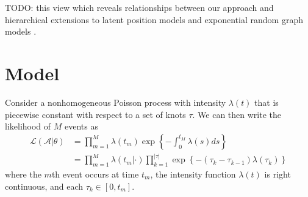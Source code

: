 \documentclass[11pt]{article}
\begin{document}
TODO: this view which reveals relationships between our approach and hierarchical extensions to latent position models \cite{Handcock2007} and exponential random graph models \cite{Schweinberger2011}.

\section{Model}

Consider a nonhomogeneous Poisson process with  intensity $\lambda(t)$ that is piecewise constant with respect to a set of knots $\tau$.  We can then write the likelihood of $M$ events as
\begin{align}
\mathcal{L}(\mathcal{A}|\theta) &= \prod_{m=1}^M \lambda(t_m) \exp\left\{ - \int_{0}^{t_M} \lambda(s)ds \right\} \\
&= \prod_{m=1}^M \lambda(t_m|\cdot) \prod_{k=1}^{|\tau|} \exp\left\{ - (\tau_{k} - \tau_{k-1}) \lambda(\tau_k) \right\}
\end{align}
\noindent where the $m$th event occurs at time $t_m$, the intensity function $\lambda(t)$ is right continuous, and each $\tau_k \in [0,t_m]$.
\end{document}

